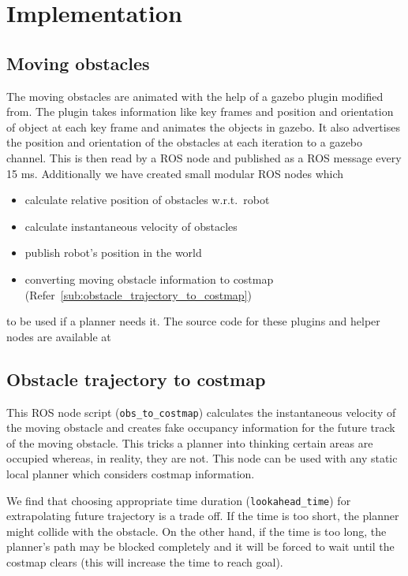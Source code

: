 
\chapter{Implementation}

\section{Moving obstacles}%
\label{sec:moving_obstacles}

The moving obstacles are animated with the help of a gazebo plugin modified from\cite{animatedBox}.
The plugin takes information like key frames and position and orientation of object at each
key frame and animates the objects in gazebo. It also advertises the position and orientation
of the obstacles at each iteration to a gazebo channel. This is then read by a ROS node and 
published as a ROS message every 15 ms.
Additionally we have created small modular ROS nodes which 
\begin{itemize}
    \item calculate relative position of obstacles w.r.t.\ robot
    \item calculate instantaneous velocity of obstacles
    \item publish robot's position in the world
    \item converting moving obstacle information to costmap (Refer~\ref{sub:obstacle_trajectory_to_costmap})
\end{itemize} 
to be used if a planner needs it.
The source code for these plugins and helper nodes are available at~\cite{movingObstacleGazebo}

\section{Obstacle trajectory to costmap}%
\label{sec:obstacle_trajectory_to_costmap}
    This ROS node script (\texttt{obs\_to\_costmap}) calculates the instantaneous velocity of the 
    moving obstacle and creates fake occupancy information for the future track of the moving obstacle. 
    This tricks a planner into thinking certain areas are occupied whereas, in reality, they are not. 
    This node can be used with any static local planner which considers costmap\cite{costmap} information.
    
    We find that choosing appropriate time duration (\texttt{lookahead\_time}) for extrapolating future trajectory is a trade
    off. If the time is too short, the planner might collide with the obstacle. On the other
    hand, if the time is too long, the planner's path may be blocked completely and it will be forced
    to wait until the costmap clears (this will increase the time to reach goal). 


